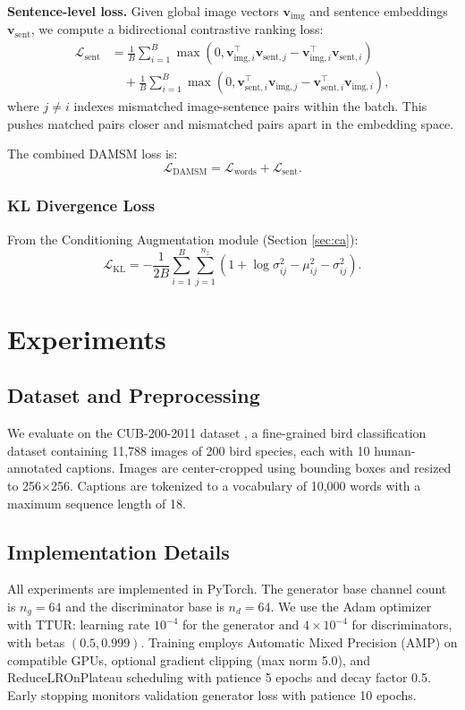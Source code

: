 \documentclass[conference]{IEEEtran}
\begin{document}
\textbf{Sentence-level loss.} Given global image vectors $\mathbf{v}_{\text{img}}$ and sentence embeddings $\mathbf{v}_{\text{sent}}$, we compute a bidirectional contrastive ranking loss:
\begin{align}
    \mathcal{L}_{\text{sent}} &= \frac{1}{B} \sum_{i=1}^{B} \max(0, \mathbf{v}_{\text{img},i}^\top \mathbf{v}_{\text{sent},j} - \mathbf{v}_{\text{img},i}^\top \mathbf{v}_{\text{sent},i}) \\
    &\quad + \frac{1}{B} \sum_{i=1}^{B} \max(0, \mathbf{v}_{\text{sent},i}^\top \mathbf{v}_{\text{img},j} - \mathbf{v}_{\text{sent},i}^\top \mathbf{v}_{\text{img},i}),
\end{align}
where $j \neq i$ indexes mismatched image-sentence pairs within the batch. This pushes matched pairs closer and mismatched pairs apart in the embedding space.

The combined DAMSM loss is:
\begin{equation}
    \mathcal{L}_{\text{DAMSM}} = \mathcal{L}_{\text{words}} + \mathcal{L}_{\text{sent}}.
\end{equation}

\subsubsection{KL Divergence Loss}
From the Conditioning Augmentation module (Section \ref{sec:ca}):
\begin{equation}
    \mathcal{L}_{\text{KL}} = -\frac{1}{2B} \sum_{i=1}^{B} \sum_{j=1}^{n_z} \left( 1 + \log \sigma_{ij}^2 - \mu_{ij}^2 - \sigma_{ij}^2 \right).
\end{equation}

\section{Experiments}
\label{sec:experiments}

\subsection{Dataset and Preprocessing}
We evaluate on the CUB-200-2011 dataset \cite{wah2011caltech}, a fine-grained bird classification dataset containing 11,788 images of 200 bird species, each with 10 human-annotated captions. Images are center-cropped using bounding boxes and resized to 256$\times$256. Captions are tokenized to a vocabulary of 10,000 words with a maximum sequence length of 18.

\subsection{Implementation Details}
All experiments are implemented in PyTorch. The generator base channel count is $n_g=64$ and the discriminator base is $n_d=64$. We use the Adam optimizer with TTUR: learning rate $10^{-4}$ for the generator and $4 \times 10^{-4}$ for discriminators, with betas $(0.5, 0.999)$. Training employs Automatic Mixed Precision (AMP) on compatible GPUs, optional gradient clipping (max norm 5.0), and ReduceLROnPlateau scheduling with patience 5 epochs and decay factor 0.5. Early stopping monitors validation generator loss with patience 10 epochs.
\end{document}

